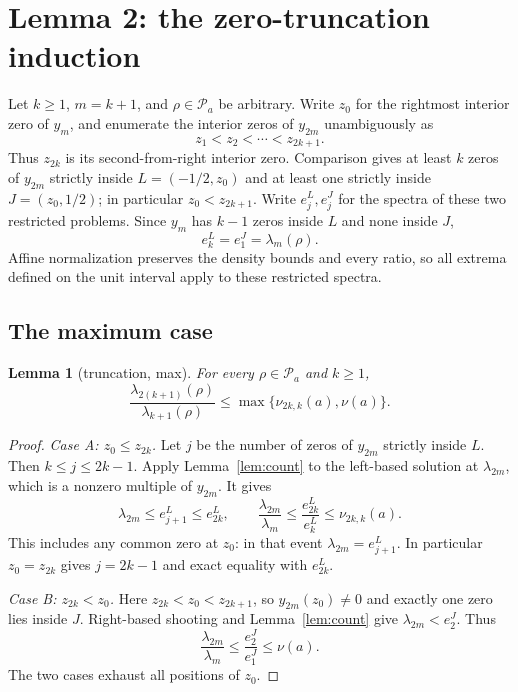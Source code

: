 ﻿\documentclass[11pt]{article}
\newtheorem{lemma}[theorem]{Lemma}
\begin{document}
\section{Lemma 2: the zero-truncation induction}\label{sec:lemma2}

Let $k\ge1$, $m=k+1$, and $\rho\in\mathcal P_a$ be arbitrary. Write
$z_0$ for the rightmost interior zero of $y_m$, and enumerate the interior
zeros of $y_{2m}$ unambiguously as
\[
 z_1<z_2<\cdots<z_{2k+1}.
\]
Thus $z_{2k}$ is its second-from-right interior zero. Comparison gives at
least $k$ zeros of $y_{2m}$ strictly inside $L=(-1/2,z_0)$ and at least
one strictly inside $J=(z_0,1/2)$; in particular $z_0<z_{2k+1}$.
Write $e_j^L,e_j^J$ for the spectra of these two restricted problems.
Since $y_m$ has $k-1$ zeros inside $L$ and none inside $J$,
\begin{equation}\label{eq:restriction-indices}
 e_k^L=e_1^J=\lambda_m(\rho).
\end{equation}
Affine normalization preserves the density bounds and every ratio, so
all extrema defined on the unit interval apply to these restricted spectra.

\subsection{The maximum case}

\begin{lemma}[truncation, max]\label{lem:max}
 For every $\rho\in\mathcal P_a$ and $k\ge1$,
 \[
 \frac{\lambda_{2(k+1)}(\rho)}{\lambda_{k+1}(\rho)}
 \le\max\{\nu_{2k,k}(a),\nu(a)\}.
 \]
\end{lemma}

\begin{proof}
 \emph{Case A: $z_0\le z_{2k}$.}
 Let $j$ be the number of zeros of $y_{2m}$ strictly inside $L$.
 Then $k\le j\le2k-1$. Apply Lemma~\ref{lem:count} to the left-based
 solution at $\lambda_{2m}$, which is a nonzero multiple of $y_{2m}$.
 It gives
 \[
 \lambda_{2m}\le e_{j+1}^L\le e_{2k}^L,
 \qquad
 \frac{\lambda_{2m}}{\lambda_m}
 \le\frac{e_{2k}^L}{e_k^L}\le\nu_{2k,k}(a).
 \]
 This includes any common zero at $z_0$: in that event
 $\lambda_{2m}=e_{j+1}^L$. In particular $z_0=z_{2k}$ gives
 $j=2k-1$ and exact equality with $e_{2k}^L$.

 \emph{Case B: $z_{2k}<z_0$.}
 Here $z_{2k}<z_0<z_{2k+1}$, so $y_{2m}(z_0)\ne0$ and exactly one
 zero lies inside $J$. Right-based shooting and Lemma~\ref{lem:count}
 give $\lambda_{2m}<e_2^J$. Thus
 \[
 \frac{\lambda_{2m}}{\lambda_m}
 \le\frac{e_2^J}{e_1^J}\le\nu(a).
 \]
 The two cases exhaust all positions of $z_0$.
\end{proof}
\end{document}
